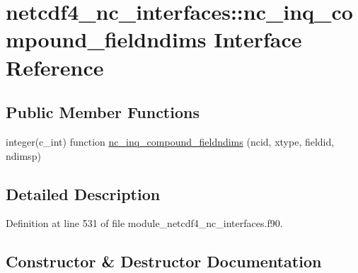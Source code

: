 \hypertarget{interfacenetcdf4__nc__interfaces_1_1nc__inq__compound__fieldndims}{}\section{netcdf4\+\_\+nc\+\_\+interfaces\+:\+:nc\+\_\+inq\+\_\+compound\+\_\+fieldndims Interface Reference}
\label{interfacenetcdf4__nc__interfaces_1_1nc__inq__compound__fieldndims}
\subsection*{Public Member Functions}
\begin{DoxyCompactItemize}
\item 
integer(c\+\_\+int) function \hyperlink{interfacenetcdf4__nc__interfaces_1_1nc__inq__compound__fieldndims_acd307b6c7996457e447628a249e9e847}{nc\+\_\+inq\+\_\+compound\+\_\+fieldndims} (ncid, xtype, fieldid, ndimsp)
\end{DoxyCompactItemize}


\subsection{Detailed Description}


Definition at line 531 of file module\+\_\+netcdf4\+\_\+nc\+\_\+interfaces.\+f90.



\subsection{Constructor \& Destructor Documentation}
\mbox{\label{interfacenetcdf4__nc__interfaces_1_1nc__inq__compound__fieldndims_acd307b6c7996457e447628a249e9e847}} 
